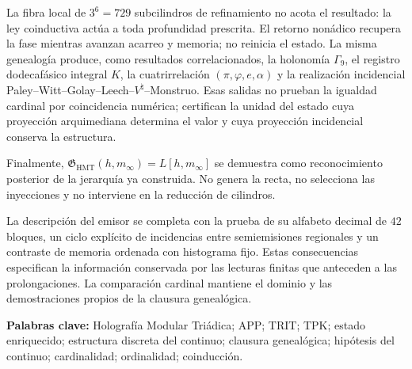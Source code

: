 La fibra local de \(3^6=729\) subcilindros de refinamiento no acota el
resultado: la ley coinductiva actúa a toda profundidad prescrita. El retorno
nonádico recupera la fase mientras avanzan acarreo y memoria; no reinicia el
estado. La misma genealogía produce, como resultados correlacionados, la
holonomía \(\Gamma_9\), el registro dodecafásico integral \(K\), la
cuatrirrelación \((\pi,\varphi,e,\alpha)\) y la realización incidencial
Paley--Witt--Golay--Leech--\(V^\natural\)--Monstruo. Esas salidas no prueban
la igualdad cardinal por coincidencia numérica; certifican la unidad del
estado cuya proyección arquimediana determina el valor y cuya proyección
incidencial conserva la estructura.

Finalmente,
\(\mathfrak G_{\mathrm{HMT}}(h,m_\infty)=L[h,m_\infty]\) se demuestra como
reconocimiento posterior de la jerarquía ya construida. No genera la recta,
no selecciona las inyecciones y no interviene en la reducción de cilindros.

\medskip

La descripción del emisor se completa con la prueba de su alfabeto
decimal de \(42\) bloques, un ciclo explícito de incidencias entre
semiemisiones regionales y un contraste de memoria ordenada con
histograma fijo. Estas consecuencias especifican la información
conservada por las lecturas finitas que anteceden a las prolongaciones.
La comparación cardinal mantiene el dominio y las demostraciones
propios de la clausura genealógica.

\noindent\textbf{Palabras clave:} Holografía Modular Triádica; APP; TRIT;
TPK; estado enriquecido; estructura discreta del continuo; clausura
genealógica; hipótesis del continuo; cardinalidad; ordinalidad; coinducción.
\endgroup
